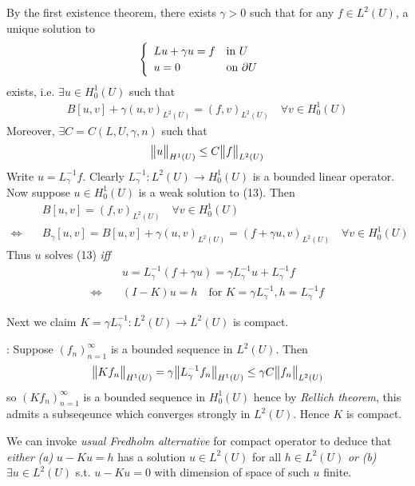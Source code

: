 \documentclass[12pt,a4paper]{report}
\newenvironment{proof}
{\begin{changemargin}{1cm}{0.5cm} 
	}%
	{\end{changemargin}
}
\newenvironment{subproof}
{\begin{changemargin}{0.5cm}{0.5cm} 
	}%
	{\end{changemargin}
}
\begin{document}
\begin{proof}
\pf By the first existence theorem, there exists $\gamma >0$ such that for any $f\in L^2(U)$, a unique solution to 
\begin{align}
\begin{cases}
\begin{array}{ll}
Lu + \gamma u = f & \text{in } U \\
u = 0 & \text{on } \partial U
\end{array}
\end{cases}
\end{align}
exists, i.e. $\exists u \in H_0^1 (U)$ such that 
\begin{align*}
B[u,v] + \gamma (u,v)_{L^2(U)} = (f,v)_{L^2(U)} \quad \forall v \in H_0^1(U)
\end{align*}
Moreover, $\exists C = C(L,U,\gamma,n)$ such that
\begin{align*}
\bigl\lVert u\bigr\rVert_{H^1(U)} \leq C \bigl\lVert f\bigr\rVert_{L^2(U)}
\end{align*}
Write $u = L^{-1}_{\gamma}f$. Clearly $L_{\gamma}^{-1} : L^2(U) \rightarrow H_0^1(U)$ is a bounded linear operator. Now suppose $u\in H_0^1(U)$ is a weak solution to (13). Then
\begin{align*}
&B[u,v] = (f,v)_{L^2(U)} \quad \forall v \in H_0^1(U) \\
\Leftrightarrow \quad & B_{\gamma}[u,v] = B[u,v] + \gamma(u,v)_{L^2(U)} = (f+ \gamma u, v)_{L^2(U)} \quad \forall v \in H_0^1(U)
\end{align*}
Thus $u$ solves (13) \emph{iff}
\begin{align*}
& u = L^{-1}_{\gamma} (f+ \gamma u) = \gamma L^{-1}_{\gamma}u + L^{-1}_{\gamma} f \\
\Leftrightarrow \quad & (I-K)u =h \quad \text{for } K = \gamma L_{\gamma}^{-1}, h= L_{\gamma}^{-1} f
\end{align*}
\s

Next we claim $K = \gamma L_{\gamma}^{-1} : L^2(U) \rightarrow L^2(U)$ is compact.
\begin{subproof}
: Suppose $(f_n)_{n=1}^{\infty}$ is a bounded sequence in $L^2(U)$. Then
\begin{align*}
\bigl\lVert Kf_n\bigr\rVert_{H^1(U)} = \gamma \bigl\lVert L_{\gamma}^{-1} f_n\bigr\rVert_{H^1(U)} \leq \gamma C \bigl\lVert f_n\bigr\rVert_{L^2(U)}
\end{align*}
so $(Kf_n)_{n=1}^{\infty}$ is a bounded sequence in $H_0^1(U)$ hence by \emph{Rellich theorem}, this admits a subseqeunce which converges strongly in $L^2(U)$. Hence $K$ is compact.
\end{subproof}
We can invoke \emph{usual Fredholm alternative} for compact operator to deduce that \emph{either} \textit{(a)} $u-Ku =h$ has a solution $u \in L^2(U)$ for all $h \in L^2(U)$ \emph{or} \textit{(b)} $\exists u \in L^2(U)$ s.t. $u-Ku =0$ with dimension of space of such $u$ finite.


\end{proof}
\end{document}
